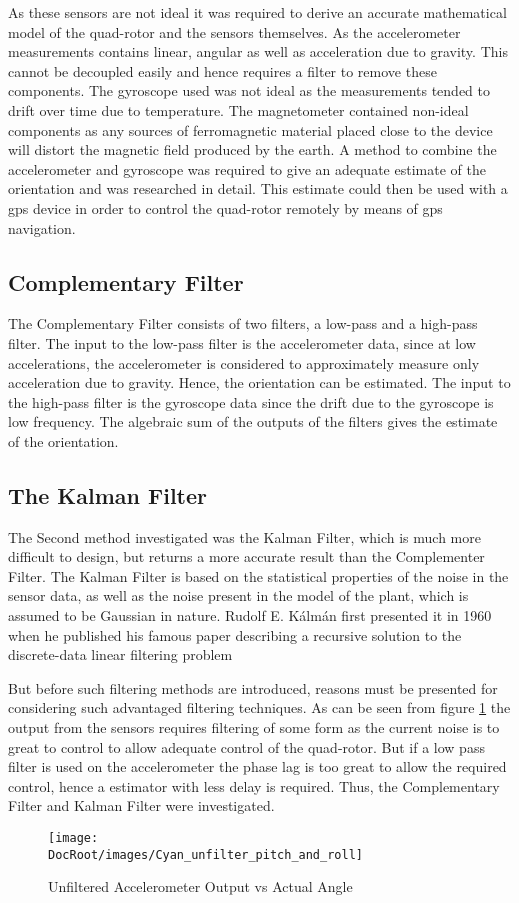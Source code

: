 As these sensors are not ideal it was  required to derive an accurate mathematical model of the quad-rotor and the sensors themselves.  As the accelerometer measurements contains linear, angular as well as acceleration due to gravity. This cannot be decoupled easily and hence requires a filter to remove these components. The gyroscope used was not ideal as the measurements tended to drift over time due to temperature. The magnetometer contained non-ideal components as any sources of ferromagnetic material placed close to the device will distort the magnetic field produced by the earth. A method to combine the accelerometer and gyroscope was required to give an adequate estimate of the orientation and was researched in detail. This estimate could then be used with a \gls{gps} device in order to control the quad-rotor remotely by means of \gls{gps} navigation. 



\subsection{Complementary Filter}
The Complementary Filter consists of two filters, a low-pass and a high-pass filter. The input to the low-pass filter is the accelerometer data, since at low accelerations, the accelerometer is considered to approximately measure only acceleration due to gravity. Hence, the orientation can be estimated. The input to the high-pass filter is the gyroscope data since the drift due to the gyroscope is low frequency. The algebraic sum of the outputs of the filters gives the estimate of the orientation.


\subsection{The Kalman Filter}
The Second method investigated was the Kalman Filter, which is much more difficult to design, but returns a more accurate result than the Complementer Filter. The Kalman Filter is based on the statistical properties of the noise in the sensor data, as well as the noise present in the model of the plant, which is assumed to be Gaussian in nature. Rudolf E. K\'alm\'an first presented it in 1960 when he published his famous paper describing a recursive solution to the discrete-data linear filtering problem \cite{kalman1960new}


But before such filtering methods are introduced, reasons must be presented for considering such advantaged filtering techniques. As can be seen from figure \ref{Fig:Cyan_unfilter_pitch_and_roll} the output from the sensors requires filtering of some form as the current noise is to great to control to allow adequate control of the quad-rotor. But if a low pass filter is used on the accelerometer the phase lag is too great to allow the required control, hence a estimator with less delay is required. Thus, the Complementary Filter and Kalman Filter were investigated.


\begin{figure}[h]
	\centering
	\texttt{[image: \\DocRoot/images/Cyan\_unfilter\_pitch\_and\_roll]}
	\caption{Unfiltered Accelerometer Output vs Actual Angle}
	\label{Fig:Cyan_unfilter_pitch_and_roll}
\end{figure}
